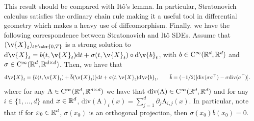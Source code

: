 This result should be compared with It\^o's lemma.
In particular, Stratonovich calculus satisfies the ordinary chain rule making it a useful tool in differential geometry which makes a heavy use of diffeomorphism.
Finally, we have the following correspondence between Stratonovich and It\^o SDEs.
Assume that \((\v{X}_t)_{t \in \sbr{0,T}}\) is a strong solution to \(\mathrm{d} \v{X}_t = b(t, \v{X}_t) \mathrm{d} t + \sigma(t, \v{X}_t) \circ \mathrm{d} \v{b}_t\), with \(b \in \mathrm{C}^\infty(\mathbb{R}^d, \mathbb{R}^d)\) and \(\sigma \in \mathrm{C}^\infty(\mathbb{R}^d, \mathbb{R}^{d \times d})\).
Then, we have that \begin{equation} \label{eq:strata_ito_transfo_sde} \mathrm{d} \v{X}_t = \{ b(t, \v{X}_t) + \bar{b}(\v{X}_t)\}\mathrm{d} t + \sigma(t, \v{X}_t) \mathrm{d} \v{b}_t , \qquad \bar{b} = (-1/2) [\mathrm{div}(\sigma \sigma^\top) - \sigma \mathrm{div}(\sigma^\top)] .
\end{equation}
where for any \(\mathrm{A} \in \mathrm{C}^\infty(\mathbb{R}^d, \mathbb{R}^{d \times d})\) we have that
\(\mathrm{div}(\mathrm{A}) \in \mathrm{C}^\infty(\mathbb{R}^d, \mathbb{R}^d)\) and for any
\(i \in \{1, \dots, d\}\) and \(x \in \mathbb{R}^d\),
\(\mathrm{div}(\mathrm{A})_i(x) = \sum_{j=1}^d \partial_j \mathrm{A}_{i,j}(x)\).
In particular, note that if for \(x_0 \in \mathbb{R}^d\), \(\sigma(x_0)\) is an orthogonal projection, then \(\sigma(x_0) \bar{b}(x_0) = 0\).

